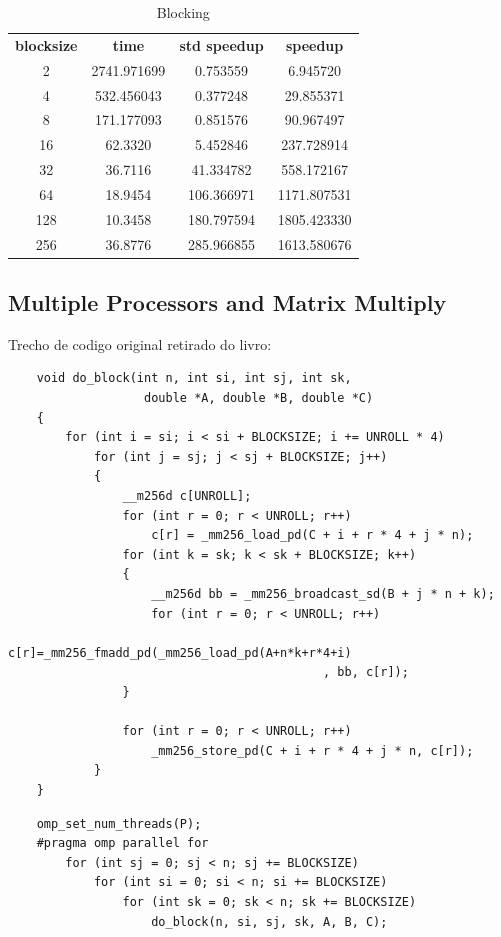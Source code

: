 \documentclass[12pt]{article}
\begin{document}
\begin{table}[h]
    \centering
    \label{tab:blocking}
    \begin{tabular}{cccc}
        \textbf{blocksize} & \textbf{time} & \textbf{std speedup} & \textbf{speedup} \\
        2 & 2741.971699 & 0.753559	& 6.945720 \\
        4 & 532.456043 & 0.377248	&29.855371 \\
        8 & 171.177093	 & 0.851576	&90.967497 \\
        16 & 62.3320 & 5.452846	&237.728914 \\
        32 & 36.7116 & 41.334782	&558.172167 \\
        64 & 18.9454 & 106.366971&	1171.807531\\
        128 & 10.3458 & 180.797594&	1805.423330\\
        256 & 36.8776 & 285.966855&	1613.580676\\
    \end{tabular}
    \caption{Blocking}
\end{table}

\subsection{Multiple Processors and Matrix Multiply}

Trecho de codigo original retirado do livro:

\begin{lstlisting}
    void do_block(int n, int si, int sj, int sk,
                   double *A, double *B, double *C)
    {
        for (int i = si; i < si + BLOCKSIZE; i += UNROLL * 4)
            for (int j = sj; j < sj + BLOCKSIZE; j++)
            {
                __m256d c[UNROLL];
                for (int r = 0; r < UNROLL; r++)
                    c[r] = _mm256_load_pd(C + i + r * 4 + j * n);
                for (int k = sk; k < sk + BLOCKSIZE; k++)
                {
                    __m256d bb = _mm256_broadcast_sd(B + j * n + k);
                    for (int r = 0; r < UNROLL; r++)
                        c[r]=_mm256_fmadd_pd(_mm256_load_pd(A+n*k+r*4+i)
                                            , bb, c[r]);
                }
    
                for (int r = 0; r < UNROLL; r++)
                    _mm256_store_pd(C + i + r * 4 + j * n, c[r]);
            }
    }
\end{lstlisting}

\begin{lstlisting}
    omp_set_num_threads(P);
    #pragma omp parallel for
        for (int sj = 0; sj < n; sj += BLOCKSIZE)
            for (int si = 0; si < n; si += BLOCKSIZE)
                for (int sk = 0; sk < n; sk += BLOCKSIZE)
                    do_block(n, si, sj, sk, A, B, C);
\end{lstlisting}
\end{document}
